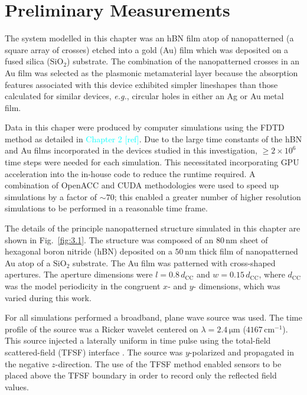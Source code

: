 \documentclass[preprint,
amsmath,amssymb,
aip,
jap,
floatfix,]{revtex4-2}
\begin{document}
		\section{Preliminary Measurements}
		\label{sec:Prelim}
		The system modelled in this chapter was an hBN film atop of nanopatterned (a square array of crosses) etched into a gold (Au) film which was deposited on a fused silica ($\mathrm{SiO_2}$) substrate. The combination of the nanopatterned crosses in an Au film was selected as the plasmonic metamaterial layer because the absorption features associated with this device exhibited simpler lineshapes than those calculated for similar devices, \textit{e.g.}, circular holes in either an Ag or Au metal film.

		Data in this chaper were produced by computer simulations using the FDTD method as detailed in \textcolor{cyan}{Chapter 2 [ref]}. Due to the large time constants of the hBN and Au films incorporated in the devices studied in this investigation, $\geq 2 \times 10^6$ time steps were needed for each simulation. This necessitated incorporating GPU acceleration into the in-house code to reduce the runtime required. A combination of OpenACC and CUDA \cite{PGI:20} methodologies were used to speed up simulations by a factor of $\sim 70$; this enabled a greater number of higher resolution simulations to be performed in a reasonable time frame.

		The details of the principle nanopatterned structure simulated in this chapter are shown in Fig.~\ref{fig:3.1}. The structure was composed of an $80\, \si{\nm}$ sheet of hexagonal boron nitride (hBN) deposited on a $50\, \si{\nm}$ thick film of nanopatterned Au atop of a $\mathrm{SiO}_{2}$ substrate. The Au film was patterned with cross-shaped apertures. The aperture dimensions were $l = 0.8 \, d_\mathrm{CC}$ and $w = 0.15 \, d_\mathrm{CC}$, where $d_\mathrm{CC}$ was the model periodicity in the congruent $x$- and $y$- dimensions, which was varied during this work. 

		For all simulations performed a broadband, plane wave source was used. The time profile of the source was a Ricker wavelet \cite{Ricker:43} centered on $\lambda = 2.4\, \si{\um}$ ($4167\, \mathrm{cm}^{-1}$). This source injected a laterally uniform in time pulse using the total-field scattered-field (TFSF) interface \cite{Merewether:80}. The source was $y$-polarized and propagated in the negative $z$-direction. The use of the TFSF method enabled sensors to be placed above the TFSF boundary in order to record only the reflected field values.
		
\end{document}
